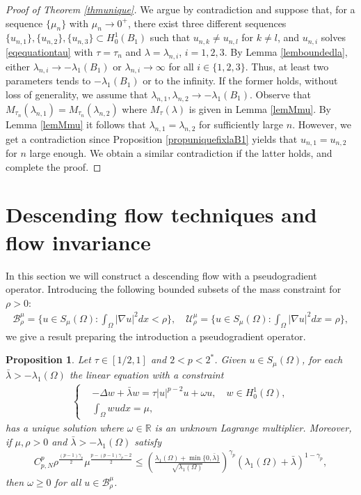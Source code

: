 \documentclass[10pt,a4paper]{article}
\newtheorem{proposition}[theorem]{Proposition}
\theoremstyle{definition} \theoremstyle{remark}
\numberwithin{equation}{section}
\newcommand{\R}{\mathbb{R}}
\newcommand{\B}{\mathcal{B}}
\newcommand{\U}{\mathcal{U}}
\newcommand{\la}{\lambda}
\newcommand{\ga}{\gamma}
\begin{document}
\begin{proof}[Proof of Theorem \ref{thmunique}]
	We argue by contradiction and suppose that, for a sequence $\{\mu_n\}$ with $\mu_n \to 0^+$, there exist three different sequences $\{u_{n,1}\}, \{u_{n,2}\}, \{u_{n,3}\} \subset H_0^1(B_1)$ such that $u_{n,k} \neq u_{n,l}$ for $k \neq l$, and $u_{n,i}$ solves \eqref{eqequationtau} with $\tau = \tau_n$ and $\la = \la_{n,i}$, $i = 1,2,3$. By Lemma \ref{lemboundedla}, either $\la_{n,i} \to -\la_1(B_1)$ or $\la_{n,i} \to \infty$ for all $i \in \{1,2,3\}$. Thus, at least two parameters tends to $-\la_1(B_1)$ or to the infinity. If the former holds, without loss of generality, we assume that $\la_{n,1}, \la_{n,2} \to -\la_1(B_1)$. Observe that $M_{\tau_n}(\la_{n,1}) = M_{\tau_n}(\la_{n,2})$ where $M_{\tau}(\la)$ is given in Lemma \ref{lemMmu}. By Lemma \ref{lemMmu} it follows that $\la_{n,1} = \la_{n,2}$ for sufficiently large $n$. However, we get a contradiction since Proposition \ref{propuniquefixlaB1} yields that $u_{n,1} = u_{n,2}$ for $n$ large enough. We obtain a similar contradiction if the latter holds, and complete the proof.
\end{proof}

\section{Descending flow techniques and flow invariance} \label{secinv}


In this section we will construct a descending flow with a pseudogradient operator. Introducing the following bounded subsets of the mass constraint for $\rho > 0$:
\begin{align*}
	\B_\rho^\mu = \bigl\{u \in S_\mu(\Omega): \int_\Omega|\nabla u|^2dx < \rho\bigr\}, \quad \U_\rho^\mu = \bigl\{u \in S_\mu(\Omega): \int_\Omega|\nabla u|^2dx = \rho\bigr\},
\end{align*}
we give a result preparing the introduction a pseudogradient operator.

\begin{proposition} \label{propuniquesolutionw}
	Let $\tau \in [1/2,1]$ and $2 < p < 2^*$. Given $u \in S_\mu(\Omega)$, for each $\bar\la > -\la_1(\Omega)$ the linear equation with a constraint
	\begin{align} \label{eqequofw1}
		\left\{
		\begin{aligned}
			& - \Delta w + \bar \la w = \tau|u|^{p-2}u + \omega u, \quad w \in H_0^1(\Omega), \\
			& \int_\Omega wu dx = \mu,
		\end{aligned}	
		\right.
	\end{align}
    has a unique solution where $\omega \in \R$ is an unknown Lagrange multiplier. Moreover, if $\mu, \rho > 0$ and $\bar \la > -\la_1(\Omega)$ satisfy
    \begin{align} \label{eqcononbarla}
    	C_{p,N}^p\rho^{\frac{(p-1)\ga_p}{2}}\mu^{\frac{p-(p-1)\ga_p - 2}{2}} \leq \left( \frac{\la_1(\Omega) + \min\{0,\bar\la\}}{\sqrt{\la_1(\Omega)}}\right) ^{\ga_p}\left( \la_1(\Omega) + \bar\la\right) ^{1-\ga_p},
    \end{align}
    then $\omega \geq 0$ for all $u \in \B_\rho^\mu$.
\end{proposition}
\end{document}
